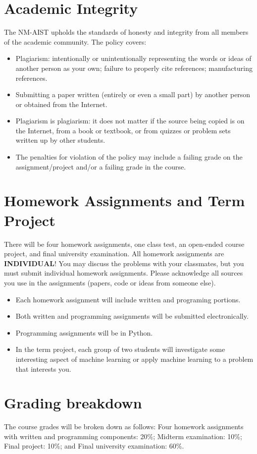 \documentclass[a4, 10pt]{article}
\begin{document}
\section{Academic Integrity}
The NM-AIST upholds the standards of honesty and integrity from all members of the
academic community. The policy covers:
\begin{itemize}
	\item Plagiarism: intentionally or unintentionally representing the words or ideas of
	another person as your own; failure to properly cite references; manufacturing
	references.
	\item Submitting a paper written (entirely or even a small part) by another person or
	obtained from the Internet.
	\item Plagiarism is plagiarism: it does not matter if the source being copied is on the
	Internet, from a book or textbook, or from quizzes or problem sets written up
	by other students.
	\item The penalties for violation of the policy may include a failing grade on the
	assignment/project and/or a failing grade in the course.
\end{itemize}

\section{Homework Assignments and Term Project}
There will be four homework assignments, one class test, an open-ended course
project, and final university examination.
All homework assignments are \textbf{INDIVIDUAL}! You may discuss the problems with
your classmates, but you must submit individual homework assignments. Please
acknowledge all sources you use in the assignments (papers, code or ideas from
someone else).
\begin{itemize}
	\item Each homework assignment will include written and programing portions.
	\item Both written and programming assignments will be submitted electronically.
	\item Programming assignments will be in Python.
	\item In the term project, each group of two students will investigate some interesting
	aspect of machine learning or apply machine learning to a problem that interests you.
		
\end{itemize}

\section{Grading breakdown}
The course grades will be broken down as follows: Four homework assignments with written and programming components: 20\%; Midterm examination: 10\%; Final project: 10\%; and Final university examination: 60\%.
\end{document}
